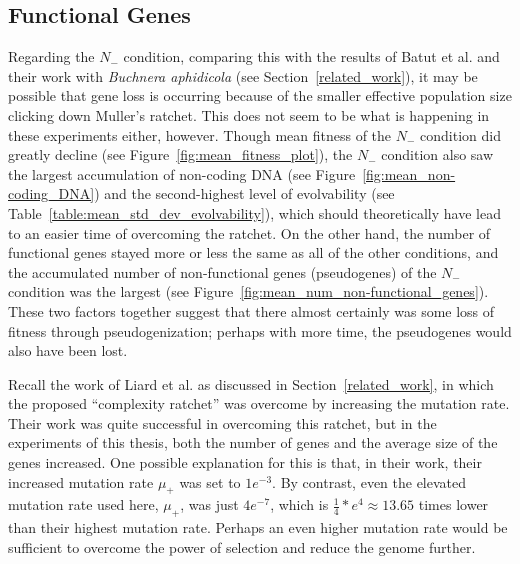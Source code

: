 \subsection{Functional Genes}
Regarding the $N_-$ condition, comparing this with the results of Batut et al. and their work with \textit{Buchnera aphidicola} (see Section~\ref{related_work}), it may be possible that gene loss is occurring because of the smaller effective population size clicking down Muller's ratchet. This does not seem to be what is happening in these experiments either, however. Though mean fitness of the $N_-$ condition did greatly decline (see Figure~\ref{fig:mean_fitness_plot}), the $N_-$ condition also saw the largest accumulation of non-coding DNA (see Figure~\ref{fig:mean_non-coding_DNA}) and the second-highest level of evolvability (see Table~\ref{table:mean_std_dev_evolvability}), which should theoretically have lead to an easier time of overcoming the ratchet. On the other hand, the number of functional genes stayed more or less the same as all of the other conditions, and the accumulated number of non-functional genes (pseudogenes) of the $N_-$ condition was the largest (see Figure~\ref{fig:mean_num_non-functional_genes}). These two factors together suggest that there almost certainly was some loss of fitness through pseudogenization; perhaps with more time, the pseudogenes would also have been lost.

Recall the work of Liard et al.\cite{Liard.2018} as discussed in Section~\ref{related_work}, in which the proposed ``complexity ratchet'' was overcome by increasing the mutation rate. Their work was quite successful in overcoming this ratchet, but in the experiments of this thesis, both the number of genes and the average size of the genes increased. One possible explanation for this is that, in their work, their increased mutation rate $\mu_+$ was set to $1e^{-3}$.  By contrast, even the elevated mutation rate used here, $\mu_+$, was just $4e^{-7}$, which is $\frac{1}{4}*e^4 \approx 13.65$ times lower than their highest mutation rate. Perhaps an even higher mutation rate would be sufficient to overcome the power of selection and reduce the genome further. 
